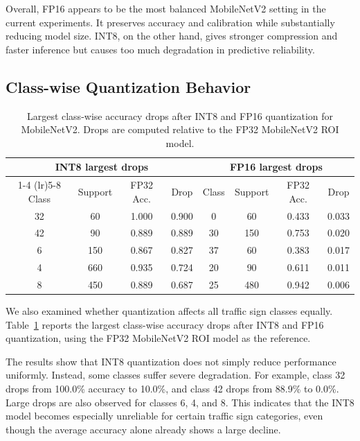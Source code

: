\documentclass{article} %
\begin{document}
Overall, FP16 appears to be the most balanced MobileNetV2 setting in the current experiments. It preserves accuracy and calibration while substantially reducing model size. INT8, on the other hand, gives stronger compression and faster inference but causes too much degradation in predictive reliability.

\subsection{Class-wise Quantization Behavior}

\begin{table}[t]
\centering
\caption{Largest class-wise accuracy drops after INT8 and FP16 quantization for MobileNetV2. Drops are computed relative to the FP32 MobileNetV2 ROI model.}
\label{tab:classwise_drops}
\small
\begin{tabular}{cccc|cccc}
\toprule
\multicolumn{4}{c|}{INT8 largest drops} & \multicolumn{4}{c}{FP16 largest drops} \\
\cmidrule(lr){1-4} \cmidrule(lr){5-8}
Class & Support & FP32 Acc. & Drop & Class & Support & FP32 Acc. & Drop \\
\midrule
32 & 60  & 1.000 & 0.900 & 0  & 60  & 0.433 & 0.033 \\
42 & 90  & 0.889 & 0.889 & 30 & 150 & 0.753 & 0.020 \\
6  & 150 & 0.867 & 0.827 & 37 & 60  & 0.383 & 0.017 \\
4  & 660 & 0.935 & 0.724 & 20 & 90  & 0.611 & 0.011 \\
8  & 450 & 0.889 & 0.687 & 25 & 480 & 0.942 & 0.006 \\
\bottomrule
\end{tabular}
\end{table}


We also examined whether quantization affects all traffic sign classes equally. Table~\ref{tab:classwise_drops} reports the largest class-wise accuracy drops after INT8 and FP16 quantization, using the FP32 MobileNetV2 ROI model as the reference.

The results show that INT8 quantization does not simply reduce performance uniformly. Instead, some classes suffer severe degradation. For example, class 32 drops from 100.0\% accuracy to 10.0\%, and class 42 drops from 88.9\% to 0.0\%. Large drops are also observed for classes 6, 4, and 8. This indicates that the INT8 model becomes especially unreliable for certain traffic sign categories, even though the average accuracy alone already shows a large decline.
\end{document}
